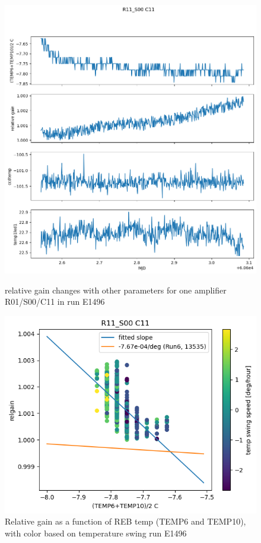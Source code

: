\begin{figure}[htbp]
\centering
\begin{minipage}{0.45\textwidth}
    \centering
    \includegraphics[width=\textwidth]{figures/gaintemp/E1496RelgainParametersTrending.png}
    \caption{relative gain changes with other parameters for one amplifier R01/S00/C11 in run E1496}
    \label{fig:relgainparamE1496}
\end{minipage}
\hfill
\begin{minipage}{0.45\textwidth}
    \centering
    \includegraphics[width=\textwidth]{figures/gaintemp/E1496RelgainDetail.png}
    \caption{Relative gain as a function of REB temp (TEMP6 and TEMP10), with color based on temperature swing run E1496}
    \label{fig:gaintempE1496}
\end{minipage}
\end{figure}
